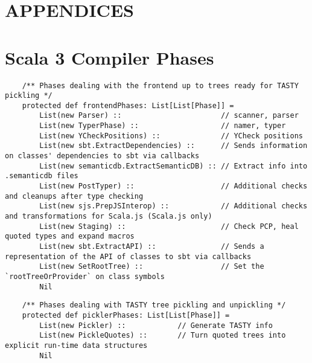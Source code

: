 \documentclass[letterpaper,12pt,titlepage,oneside,final]{book}
\begin{document}
\chapter*{APPENDICES}

\chapter{Scala 3 Compiler Phases}
\label{appendix:dotty-phases}
\begin{verbatim}
	/** Phases dealing with the frontend up to trees ready for TASTY pickling */
	protected def frontendPhases: List[List[Phase]] =
		List(new Parser) ::                       // scanner, parser
		List(new TyperPhase) ::                   // namer, typer
		List(new YCheckPositions) ::              // YCheck positions
		List(new sbt.ExtractDependencies) ::      // Sends information on classes' dependencies to sbt via callbacks
		List(new semanticdb.ExtractSemanticDB) :: // Extract info into .semanticdb files
		List(new PostTyper) ::                    // Additional checks and cleanups after type checking
		List(new sjs.PrepJSInterop) ::            // Additional checks and transformations for Scala.js (Scala.js only)
		List(new Staging) ::                      // Check PCP, heal quoted types and expand macros
		List(new sbt.ExtractAPI) ::               // Sends a representation of the API of classes to sbt via callbacks
		List(new SetRootTree) ::                  // Set the `rootTreeOrProvider` on class symbols
		Nil
\end{verbatim}

\begin{verbatim}
	/** Phases dealing with TASTY tree pickling and unpickling */
	protected def picklerPhases: List[List[Phase]] =
		List(new Pickler) ::            // Generate TASTY info
		List(new PickleQuotes) ::       // Turn quoted trees into explicit run-time data structures
		Nil
\end{verbatim}
\end{document}
